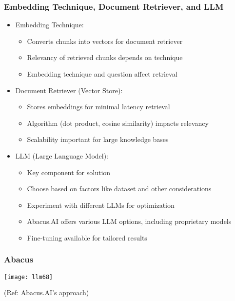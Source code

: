 \begin{frame}[fragile]\frametitle{Embedding Technique, Document Retriever, and LLM}

\begin{itemize}
    \item Embedding Technique:
    \begin{itemize}
        \item Converts chunks into vectors for document retriever
        \item Relevancy of retrieved chunks depends on technique
        \item Embedding technique and question affect retrieval
    \end{itemize}
    \item Document Retriever (Vector Store):
    \begin{itemize}
        \item Stores embeddings for minimal latency retrieval
        \item Algorithm (dot product, cosine similarity) impacts relevancy
        \item Scalability important for large knowledge bases
    \end{itemize}
    \item LLM (Large Language Model):
    \begin{itemize}
        \item Key component for solution
        \item Choose based on factors like dataset and other considerations
        \item Experiment with different LLMs for optimization
        \item Abacus.AI offers various LLM options, including proprietary models
        \item Fine-tuning available for tailored results
    \end{itemize}
\end{itemize}
\end{frame}

\begin{frame}[fragile]\frametitle{Abacus}

\begin{center}
\texttt{[image: llm68]}
\end{center}	

{\tiny (Ref: Abacus.AI’s approach)}
  
\end{frame}

